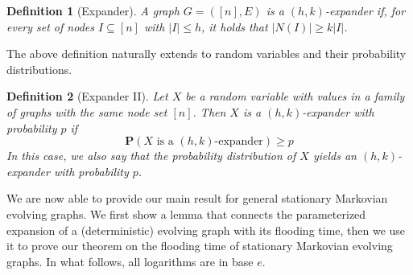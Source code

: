 \documentclass[10pt,a4paper]{article}
\newtheorem{definition}{Definition}[section]
\newcommand{\Prob}[1]{\mathbf{P} \left( #1 \right)}
\begin{document}
\begin{definition}[Expander]
A graph $G=([n],E)$ is a \emph{$(h,k)$-expander} if, for every set of nodes $I \subseteq [n]$ with $|I| \leqslant h$, it holds that $|N(I)| \geqslant k |I|$.
\end{definition}

\noindent The above definition naturally extends to random variables and their probability distributions.

\begin{definition}[Expander II]
Let $X$ be a random variable with values in a family of graphs with the same node set $[n]$. Then $X$ is a \emph{$(h,k)$-expander} with probability $p$ if
$$
\Prob{X \mbox{ is a } (h,k)\mbox{-expander}} \geqslant p
$$
In this case, we also say that the probability distribution of $X$ \emph{yields} an $(h,k)$-expander with probability $p$.
\end{definition}

\noindent We are now able to provide our main result for general stationary Markovian evolving graphs. We first show a lemma that connects the parameterized expansion of a (deterministic) evolving graph with its flooding time, then we use it to prove our theorem on the flooding time of stationary Markovian evolving graphs. In what follows, all    logarithms are in  base $e$.
\end{document}
